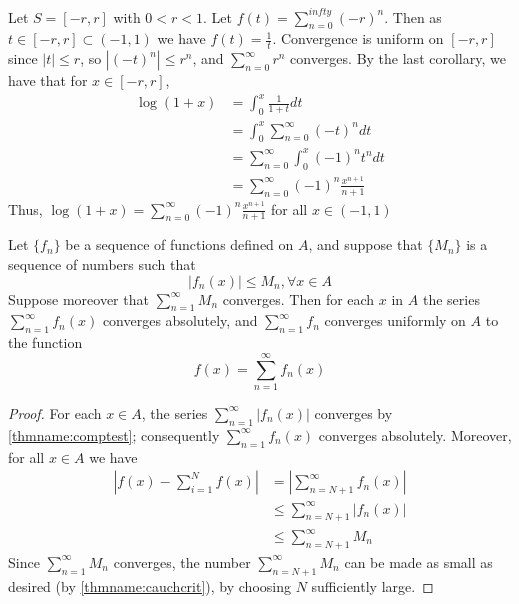 \begin{example}
    Let $S = [-r,r]$ with $0 < r < 1$. Let $f(t) = \sum_{n=0}^{infty}(-r)^n$. Then as $t \in [-r,r] \subset ( -1,1)$ we have $f(t) = \frac{1}{t}$. Convergence is uniform on $[-r,r]$ since $|t| \leq r$, so $|(-t)^n| \leq r^n$, and $\sum_{n=0}^{\infty}r^n$ converges. By the last corollary, we have that for $x \in [-r,r]$, \begin{align*}
        \log(1+x) &= \int_0^x\frac{1}{1+t}dt \tag{by the FTC} \\
        &= \int_0^x\sum_{n=0}^{\infty}(-t)^ndt \\
        &= \sum_{n=0}^{\infty}\int_0^x(-1)^nt^ndt \\
        &= \sum_{n=0}^{\infty}(-1)^n\frac{x^{n+1}}{n+1} \tag{by the FTC}
    \end{align*}
    Thus, $\log(1+x) = \sum_{n=0}^{\infty}(-1)^n\frac{x^{n+1}}{n+1}$ for all $x \in (-1,1)$
\end{example}



\begin{theorem}\label{thmname:mtest}
    Let $\{f_n\}$ be a sequence of functions defined on $A$, and suppose that $\{M_n\}$ is a sequence of numbers such that \begin{equation*}
        |f_n(x)|\leq M_n,\forall x \in A
    \end{equation*}
    Suppose moreover that $\sum\limits_{n=1}^{\infty}M_n$ converges. Then for each $x$ in $A$ the series $\sum\limits_{n=1}^{\infty}f_n(x)$ converges absolutely, and $\sum\limits_{n=1}^{\infty}f_n$ converges uniformly on $A$ to the function \begin{equation*}
        f(x) = \sum\limits_{n=1}^{\infty}f_n(x)
    \end{equation*}
\end{theorem}
\begin{proof}
    For each $x \in A$, the series $\sum\limits_{n=1}^{\infty}|f_n(x)|$ converges by \ref{thmname:comptest}; consequently $\sum\limits_{n=1}^{\infty}f_n(x)$ converges absolutely. Moreover, for all $x \in A$ we have \begin{align*}
        \left|f(x) - \sum\limits_{i=1}^{N}f(x)\right| &= \left|\sum\limits_{n=N+1}^{\infty}f_n(x)\right| \\
        &\leq \sum\limits_{n=N+1}^{\infty}|f_n(x)| \\
        &\leq \sum\limits_{n=N+1}^{\infty}M_n
    \end{align*}
    Since $\sum\limits_{n=1}^{\infty}M_n$ converges, the number $\sum\limits_{n=N+1}^{\infty}M_n$ can be made as small as desired (by \ref{thmname:cauchcrit}), by choosing $N$ sufficiently large.
\end{proof}


